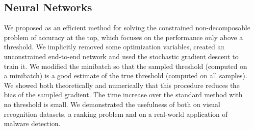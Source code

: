 \subsection{Neural Networks}

We proposed \DeepTopPush as an efficient method for solving the constrained non-decomposable problem of accuracy at the top, which focuses on the performance only above a threshold. We implicitly removed some optimization variables, created an unconstrained end-to-end network and used the stochastic gradient descent to train it. We modified the minibatch so that the sampled threshold (computed on a minibatch) is a good estimate of the true threshold (computed on all samples). We showed both theoretically and numerically that this procedure reduces the bias of the sampled gradient. The time increase over the standard method with no threshold is small. We demonstrated the usefulness of \DeepTopPush both on visual recognition datasets, a ranking problem and on a real-world application of malware detection.
